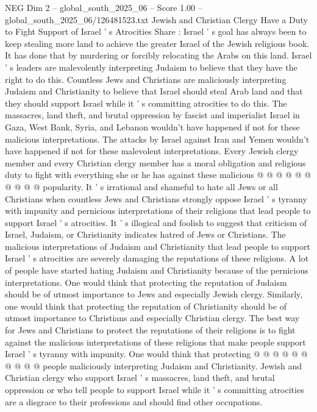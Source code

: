 \begin{textsample}{NEG Dim 2 – global\_south\_2025\_06 – Score 1.00 – global\_south\_2025\_06/126481523.txt}  \label{ex:f2_neg_198}
Jewish and Christian Clergy Have a Duty to Fight Support of Israel ' s Atrocities Share : Israel ' s goal has always been to keep stealing more land to achieve the greater Israel of the Jewish religious book.
It has done that by murdering or forcibly relocating the Arabs on this land.
Israel ' s leaders are malevolently interpreting Judaism to believe that they have the right to do this.
Countless Jews and Christians are maliciously interpreting Judaism and Christianity to believe that Israel should steal Arab land and that they should support Israel while it ' s committing atrocities to do this.
The massacres, land theft, and brutal oppression by fascist and imperialist Israel in Gaza, West Bank, Syria, and Lebanon wouldn't have happened if not for these malicious interpretations.
The attacks by Israel against Iran and Yemen wouldn't have happened if not for these malevolent interpretations.
Every Jewish clergy member and every Christian clergy member has a moral obligation and religious duty to fight with everything she or he has against these malicious @ @ @ @ @ @ @ @ @ @ popularity.
It ' s irrational and shameful to hate all Jews or all Christians when countless Jews and Christians strongly oppose Israel ' s tyranny with impunity and pernicious interpretations of their religions that lead people to support Israel ' s atrocities.
It ' s illogical and foolish to suggest that criticism of Israel, Judaism, or Christianity indicates hatred of Jews or Christians.
The malicious interpretations of Judaism and Christianity that lead people to support Israel ' s atrocities are severely damaging the reputations of these religions.
A lot of people have started hating Judaism and Christianity because of the pernicious interpretations.
One would think that protecting the reputation of Judaism should be of utmost importance to Jews and especially Jewish clergy.
Similarly, one would think that protecting the reputation of Christianity should be of utmost importance to Christians and especially Christian clergy.
The best way for Jews and Christians to protect the reputations of their religions is to fight against the malicious interpretations of these religions that make people support Israel ' s tyranny with impunity.
One would think that protecting @ @ @ @ @ @ @ @ @ @ people maliciously interpreting Judaism and Christianity.
Jewish and Christian clergy who support Israel ' s massacres, land theft, and brutal oppression or who tell people to support Israel while it ' s committing atrocities are a disgrace to their professions and should find other occupations.

\end{textsample}
